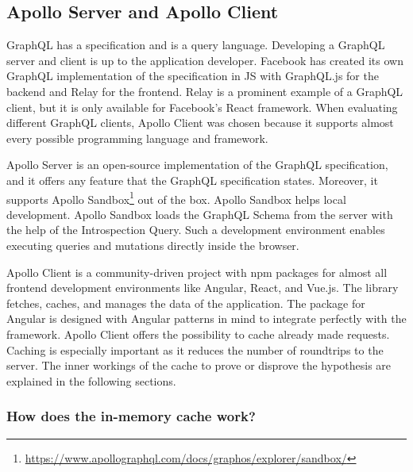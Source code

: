 \subsection{Apollo Server and Apollo Client}\label{subsection:background:graphql:apollo-server-client}

GraphQL has a specification and is a query language. Developing a GraphQL server and client is up to the application developer. Facebook has created its own GraphQL implementation of the specification in \ac{JS} with GraphQL.js for the backend and Relay for the frontend. Relay is a prominent example of a GraphQL client, but it is only available for Facebook's React framework. When evaluating different GraphQL clients, Apollo Client was chosen because it supports almost every possible programming language and framework.

\bigskip

\noindent Apollo Server is an open-source implementation of the GraphQL specification, and it offers any feature that the GraphQL specification states. Moreover, it supports Apollo Sandbox\footnote{\url{https://www.apollographql.com/docs/graphos/explorer/sandbox/}} out of the box. \cite{misc:-:background:graphql:apollo-server-introduction} Apollo Sandbox helps local development. Apollo Sandbox loads the GraphQL Schema from the server with the help of the Introspection Query. \cite{misc:-:background:graphql:apollo-sandbox} Such a development environment enables executing queries and mutations directly inside the browser.

\bigskip

\noindent Apollo Client is a community-driven project with npm packages for almost all frontend development environments like Angular, React, and Vue.js. The library fetches, caches, and manages the data of the application. The package for Angular is designed with Angular patterns in mind to integrate perfectly with the framework. Apollo Client offers the possibility to cache already made requests. \cite{misc:-:background:graphql:apollo-angular-client-overview} \cite{misc:-:background:graphql:apollo-client-overview} Caching is especially important as it reduces the number of roundtrips to the server. The inner workings of the cache to prove or disprove the hypothesis are explained in the following sections.

\subsubsection{How does the in-memory cache work?}\label{subsubsection:background:graphql:apollo-server-client:in-memory-cache-working}

